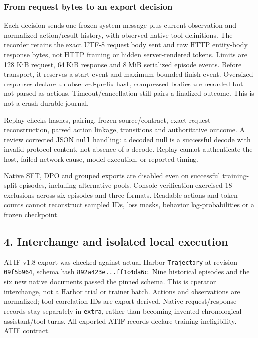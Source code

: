 \documentclass[
  11pt,
  letterpaper,
]{article}
\begin{document}
\subsubsection{From request bytes to an export
decision}\label{from-request-bytes-to-an-export-decision}

Each decision sends one frozen system message plus current observation
and normalized action/result history, with observed native tool
definitions. The recorder retains the exact UTF-8 request body sent and
raw HTTP entity-body response bytes, not HTTP framing or hidden
server-rendered tokens. Limits are 128 KiB request, 64 KiB response and
8 MiB serialized episode events. Before transport, it reserves a start
event and maximum bounded finish event. Oversized responses declare an
observed-prefix hash; compressed bodies are recorded but not parsed as
actions. Timeout/cancellation still pairs a finalized outcome. This is
not a crash-durable journal.

Replay checks hashes, pairing, frozen source/contract, exact request
reconstruction, parsed action linkage, transitions and authoritative
outcome. A review corrected JSON \texttt{null} handling: a decoded null
is a successful decode with invalid protocol content, not absence of a
decode. Replay cannot authenticate the host, failed network cause, model
execution, or reported timing.

Native SFT, DPO and grouped exports are disabled even on successful
training-split episodes, including alternative pools. Console
verification exercised 18 exclusions across six episodes and three
formats. Readable actions and token counts cannot reconstruct sampled
IDs, loss masks, behavior log-probabilities or a frozen checkpoint.

\newpage

\subsection{4. Interchange and isolated local
execution}\label{interchange-and-isolated-local-execution}

ATIF-v1.8 export was checked against actual Harbor \texttt{Trajectory}
at revision \texttt{09f5b964}, schema hash
\texttt{892a423e...ff1c4da6c}. Nine historical episodes and the six new
native documents passed the pinned schema. This is operator interchange,
not a Harbor trial or trainer batch. Actions and observations are
normalized; tool correlation IDs are export-derived. Native
request/response records stay separately in \texttt{extra}, rather than
becoming invented chronological assistant/tool turns. All exported ATIF
records declare training ineligibility. \href{../atif.md}{ATIF
contract}.
\end{document}
